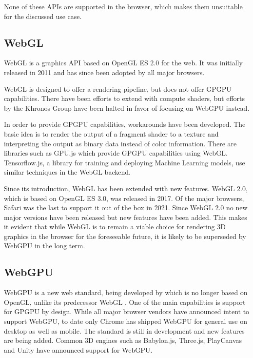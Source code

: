 None of these \glspl{API} are supported in the browser, which makes them unsuitable for the discussed use case.

\subsection{WebGL}

\gls{WebGL} is a graphics \gls{API} based on \gls{OpenGL ES} 2.0 for the web. It was initially released in 2011 and has since been adopted by all major browsers.

\gls{WebGL} is designed to offer a rendering pipeline, but does not offer \gls{GPGPU} capabilities. There have been efforts to extend with compute shaders, but efforts by the \gls{Khronos Group} have been halted in favor of focusing on \gls{WebGPU} instead.

In order to provide \gls{GPGPU} capabilities, workarounds have been developed. The basic idea is to render the output of a fragment shader to a texture and interpreting the output as binary data instead of color information.
There are libraries such as GPU.js which provide \gls{GPGPU} capabilities using \gls{WebGL}. Tensorflow.js, a library for training and deploying Machine Learning models, use similar techniques in the \gls{WebGL} backend.

Since its introduction, \gls{WebGL} has been extended with new features. \gls{WebGL} 2.0, which is based on \gls{OpenGL ES} 3.0, was released in 2017. Of the major browsers, Safari was the last to support it out of the box in 2021. Since \gls{WebGL} 2.0 no new major versions have been released but new features have been added. This makes it evident that while \gls{WebGL} is to remain a viable choice for rendering 3D graphics in the browser for the foreseeable future, it is likely to be superseded by \gls{WebGPU} in the long term.

\subsection{WebGPU}

\gls{WebGPU} is a new web standard, being developed by  which is no longer based on \gls{OpenGL}, unlike its predecessor \gls{WebGL} \cite{webgpuSpecification}. One of the main capabilities is support for \gls{GPGPU} by design. While all major browser vendors have announced intent to support \gls{WebGPU}, to date only Chrome has shipped \gls{WebGPU} for general use on desktop as well as mobile.
The standard is still in development and new features are being added.
Common 3D engines such as \gls{Babylon.js}, \gls{Three.js}, \gls{PlayCanvas} and \gls{Unity} have announced support for \gls{WebGPU}.

